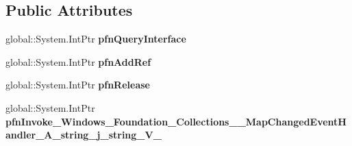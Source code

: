 \subsection*{Public Attributes}
\begin{DoxyCompactItemize}
\item 
\mbox{\label{struct_windows_1_1_foundation_1_1_collections_1_1_map_changed_event_handler___a__string__j__string___v_______impl_1_1_vtbl_a129ae1d10cb6171bb093cca551ca564e}} 
global\+::\+System.\+Int\+Ptr {\bfseries pfn\+Query\+Interface}
\item 
\mbox{\label{struct_windows_1_1_foundation_1_1_collections_1_1_map_changed_event_handler___a__string__j__string___v_______impl_1_1_vtbl_a4a0ca7324afaac99644948658ceb2d53}} 
global\+::\+System.\+Int\+Ptr {\bfseries pfn\+Add\+Ref}
\item 
\mbox{\label{struct_windows_1_1_foundation_1_1_collections_1_1_map_changed_event_handler___a__string__j__string___v_______impl_1_1_vtbl_aa6b3ce001cee93a4c0c8fca54ef8a601}} 
global\+::\+System.\+Int\+Ptr {\bfseries pfn\+Release}
\item 
\mbox{\label{struct_windows_1_1_foundation_1_1_collections_1_1_map_changed_event_handler___a__string__j__string___v_______impl_1_1_vtbl_a81c1a57629bf9785c40e91fc75ba48ee}} 
global\+::\+System.\+Int\+Ptr {\bfseries pfn\+Invoke\+\_\+\+Windows\+\_\+\+Foundation\+\_\+\+Collections\+\_\+\+\_\+\+Map\+Changed\+Event\+Handler\+\_\+\+A\+\_\+string\+\_\+j\+\_\+string\+\_\+\+V\+\_\+}
\end{DoxyCompactItemize}
